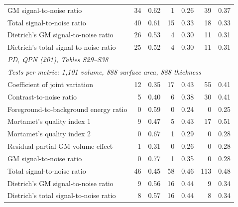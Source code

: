 \begin{tabular}{lrrrrrr}
GM signal-to-noise ratio & 34 & 0.62 & 1 & 0.26 & 39 & 0.37 \\
Total signal-to-noise ratio & 40 & 0.61 & 15 & 0.33 & 18 & 0.33 \\
Dietrich's GM signal-to-noise ratio & 26 & 0.53 & 4 & 0.30 & 11 & 0.31 \\
Dietrich's total signal-to-noise ratio & 25 & 0.52 & 4 & 0.30 & 11 & 0.31 \\
\midrule
\multicolumn{7}{l}{\textit{PD{,} QPN (201){,} Tables S29--S38}} \\
\multicolumn{7}{l}{\textit{Tests per metric: 1{,}101 volume{,} 888 surface area{,} 888 thickness}} \\
Coefficient of joint variation & 12 & 0.35 & 17 & 0.43 & 55 & 0.41 \\
Contrast-to-noise ratio & 5 & 0.40 & 6 & 0.38 & 30 & 0.41 \\
Foreground-to-background energy ratio & 0 & 0.59 & 0 & 0.24 & 0 & 0.25 \\
Mortamet's quality index 1 & 9 & 0.47 & 5 & 0.43 & 17 & 0.51 \\
Mortamet's quality index 2 & 0 & 0.67 & 1 & 0.29 & 0 & 0.28 \\
Residual partial GM volume effect & 1 & 0.31 & 0 & 0.26 & 0 & 0.28 \\
GM signal-to-noise ratio & 0 & 0.77 & 1 & 0.35 & 0 & 0.28 \\
Total signal-to-noise ratio & 46 & 0.45 & 58 & 0.46 & 113 & 0.48 \\
Dietrich's GM signal-to-noise ratio & 9 & 0.56 & 16 & 0.44 & 9 & 0.34 \\
Dietrich's total signal-to-noise ratio & 8 & 0.57 & 16 & 0.44 & 8 & 0.34 \\
\bottomrule
\end{tabular}
